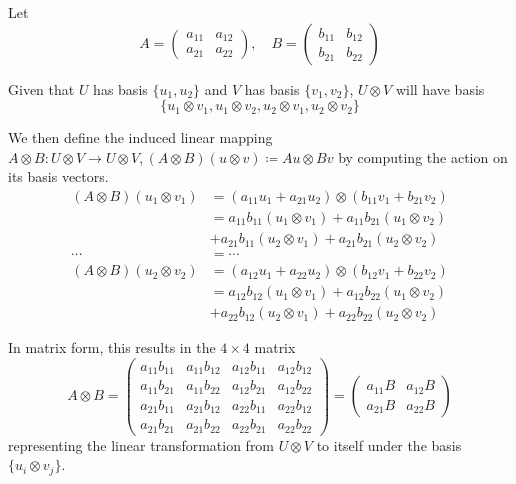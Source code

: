 	\begin{example}
	  \label{ex:tensor-product-of-two-2times2-matrices}
		Let 
		\begin{equation}
			A = \begin{pmatrix}
			a_{11} & a_{12} \\ a_{21} & a_{22}
			\end{pmatrix}, \quad B = \begin{pmatrix}
			b_{11} & b_{12} \\ b_{21} & b_{22}
			\end{pmatrix}
		\end{equation}

		Given that $U$ has basis $\{u_1, u_2\}$ and $V$ has basis $\{v_1, v_2\}$, $U \otimes V$ will have basis 
		\begin{equation}
			\{u_1 \otimes v_1, u_1 \otimes v_2, u_2 \otimes v_1, u_2 \otimes v_2\}
		\end{equation}

		We then define the induced linear mapping $A\otimes B: U \otimes V \to U \otimes V, (A \otimes B)(u\otimes v) \coloneqq Au \otimes Bv$ by computing the action on its basis vectors. 
		\begin{align}
			(A \otimes B) (u_1 \otimes v_1) &= (a_{11} u_1 + a_{21} u_2) \otimes (b_{11} v_1 + b_{21} v_2) \\
			& = a_{11} b_{11} (u_1 \otimes v_1) + a_{11} b_{21} (u_1 \otimes v_2) \\
			& + a_{21} b_{11} (u_2 \otimes v_1) + a_{21} b_{21} (u_2 \otimes v_2) \\
			\cdots & = \cdots \\
			(A \otimes B) (u_2 \otimes v_2) & = (a_{12} u_1 + a_{22} u_2) \otimes (b_{12} v_1 + b_{22} v_2) \\
			& = a_{12} b_{12} (u_1 \otimes v_1) + a_{12} b_{22} (u_1 \otimes v_2) \\
			& + a_{22} b_{12} (u_2 \otimes v_1) + a_{22} b_{22} (u_2 \otimes v_2) 
		\end{align}

		In matrix form, this results in the $4\times 4$ matrix 
		\begin{equation}
			A \otimes B = \begin{pmatrix}
				a_{11} b_{11} & a_{11} b_{12} & a_{12} b_{11} & a_{12} b_{12} \\
				a_{11} b_{21} & a_{11} b_{22} & a_{12} b_{21} & a_{12} b_{22} \\
				a_{21} b_{11} & a_{21} b_{12} & a_{22} b_{11} & a_{22} b_{12} \\
				a_{21} b_{21} & a_{21} b_{22} & a_{22} b_{21} & a_{22} b_{22} 
			\end{pmatrix} = \begin{pmatrix}
				a_{11} B & a_{12} B \\
				a_{21} B & a_{22} B 
			\end{pmatrix}
		\end{equation}
		representing the linear transformation from $U \otimes V$ to itself under the basis $\{u_i \otimes v_j\}$. 
	\end{example}

